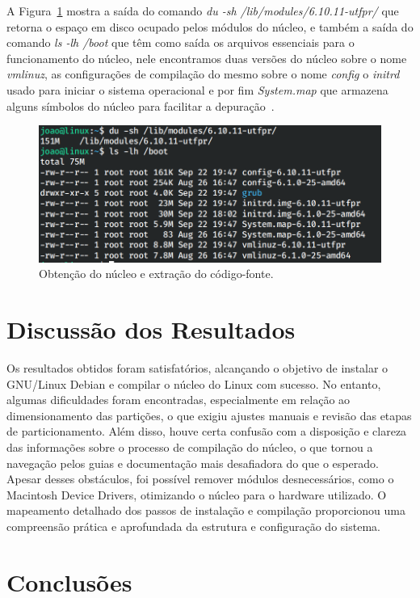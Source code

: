 \documentclass[
	12pt,				%
	oneside,   	        %
	a4paper,			%
	english,			%
	french,				%
	spanish,			%
	brazil,				%
	]{pacotes/abntex2}
\begin{document}
A Figura~\ref{fig:boot} mostra a saída do comando \textit{du -sh /lib/modules/6.10.11-utfpr/} que retorna o espaço em disco ocupado pelos módulos do núcleo, e também a saída do comando \textit{ls -lh /boot} que têm como saída os arquivos essenciais para o funcionamento do núcleo, nele encontramos duas versões do núcleo sobre o nome \textit{vmlinuz}, as configurações de compilação do mesmo sobre o nome \textit{config} o \textit{initrd} usado para iniciar o sistema operacional e por fim \textit{System.map} que armazena alguns símbolos do núcleo para facilitar a depuração~\cite{linuxKernel}.

\begin{figure}[H]
  \centering
  \includegraphics[scale=0.3]{figuras/boot.png}
  \caption{Obtenção do núcleo e extração do código-fonte.}
  \label{fig:boot}
\end{figure}

\section{Discussão dos Resultados}
\label{sec:discussao}

Os resultados obtidos foram satisfatórios, alcançando o objetivo de instalar o GNU/Linux Debian e compilar o núcleo do Linux com sucesso. No entanto, algumas dificuldades foram encontradas, especialmente em relação ao dimensionamento das partições, o que exigiu ajustes manuais e revisão das etapas de particionamento. Além disso, houve certa confusão com a disposição e clareza das informações sobre o processo de compilação do núcleo, o que tornou a navegação pelos guias e documentação mais desafiadora do que o esperado. Apesar desses obstáculos, foi possível remover módulos desnecessários, como o Macintosh Device Drivers, otimizando o núcleo para o hardware utilizado. O mapeamento detalhado dos passos de instalação e compilação proporcionou uma compreensão prática e aprofundada da estrutura e configuração do sistema.

\section{Conclusões}
\label{sec:conclusoes}
\end{document}
